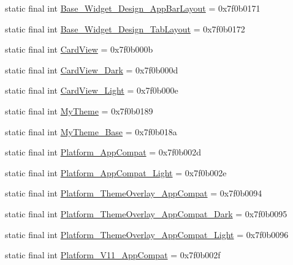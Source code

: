 \begin{CompactItemize}
\item 
static final int \hyperlink{classandroid_1_1support_1_1v7_1_1mediarouter_1_1_r_1_1style_264688a763716c9a5c7a5cee85caa92a}{Base\_\-Widget\_\-Design\_\-AppBarLayout} = 0x7f0b0171
\item 
static final int \hyperlink{classandroid_1_1support_1_1v7_1_1mediarouter_1_1_r_1_1style_8f9123bb4d729061b7a30572e88ca78c}{Base\_\-Widget\_\-Design\_\-TabLayout} = 0x7f0b0172
\item 
static final int \hyperlink{classandroid_1_1support_1_1v7_1_1mediarouter_1_1_r_1_1style_8511f30cf4ba1705c91e811246a85441}{CardView} = 0x7f0b000b
\item 
static final int \hyperlink{classandroid_1_1support_1_1v7_1_1mediarouter_1_1_r_1_1style_1b5665a9d63f866493a953216965a2f6}{CardView\_\-Dark} = 0x7f0b000d
\item 
static final int \hyperlink{classandroid_1_1support_1_1v7_1_1mediarouter_1_1_r_1_1style_07e180e327dbe6c52703664769e2a68b}{CardView\_\-Light} = 0x7f0b000e
\item 
static final int \hyperlink{classandroid_1_1support_1_1v7_1_1mediarouter_1_1_r_1_1style_d49e9b88b4c84f3722c0021e4d29cd02}{MyTheme} = 0x7f0b0189
\item 
static final int \hyperlink{classandroid_1_1support_1_1v7_1_1mediarouter_1_1_r_1_1style_b1b3ac93c8a26d3740c55f9022502b20}{MyTheme\_\-Base} = 0x7f0b018a
\item 
static final int \hyperlink{classandroid_1_1support_1_1v7_1_1mediarouter_1_1_r_1_1style_e161bb190d506eb0a22ea1ac56c0b2c8}{Platform\_\-AppCompat} = 0x7f0b002d
\item 
static final int \hyperlink{classandroid_1_1support_1_1v7_1_1mediarouter_1_1_r_1_1style_40cadca15315f93d9dc4a42ce9c51277}{Platform\_\-AppCompat\_\-Light} = 0x7f0b002e
\item 
static final int \hyperlink{classandroid_1_1support_1_1v7_1_1mediarouter_1_1_r_1_1style_4bcc221301ee1506fd058b968ef8e1f0}{Platform\_\-ThemeOverlay\_\-AppCompat} = 0x7f0b0094
\item 
static final int \hyperlink{classandroid_1_1support_1_1v7_1_1mediarouter_1_1_r_1_1style_116e77b597a8872b698807b8fb111fb1}{Platform\_\-ThemeOverlay\_\-AppCompat\_\-Dark} = 0x7f0b0095
\item 
static final int \hyperlink{classandroid_1_1support_1_1v7_1_1mediarouter_1_1_r_1_1style_8b5e619f3ff499deb7c3fe966406b9b6}{Platform\_\-ThemeOverlay\_\-AppCompat\_\-Light} = 0x7f0b0096
\item 
static final int \hyperlink{classandroid_1_1support_1_1v7_1_1mediarouter_1_1_r_1_1style_47cc305b4dbcfe1a5328d496c5c31cbe}{Platform\_\-V11\_\-AppCompat} = 0x7f0b002f

\end{CompactItemize}
